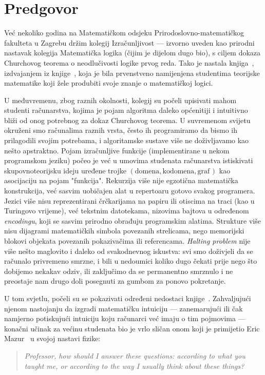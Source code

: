 \chapter[]{Predgovor}


Već nekoliko godina na Matematičkom odsjeku Prirodoslovno-matematičkog fakulteta u Zagrebu držim kolegij Izračunljivost --- izvorno uveden kao prirodni nastavak kolegija Matematička logika (čijim je dijelom dugo bio), s ciljem dokaza Churchovog teorema o neodlučivosti logike prvog reda. Tako je nastala knjiga~\cite{skr:Vuk}, izdvajanjem iz knjige~\cite{skr:VukML}, koja je bila prvenstveno namijenjena studentima teorijske matematike koji žele produbiti svoje znanje o matematičkoj logici.

U međuvremenu, zbog raznih okolnosti, kolegij su počeli upisivati mahom studenti računarstva, kojima je pojam algoritma daleko općenitiji i intuitivno bliži od onog potrebnog za dokaz Churchovog teorema. U suvremenom svijetu okruženi smo računalima raznih vrsta, često ih programiramo da bismo ih prilagodili svojim potrebama, i algoritamske sustave više ne doživljavamo kao nešto apstraktno. Pojam izračunljive funkcije (implementirane u nekom programskom jeziku) počeo je već u umovima studenata računarstva istiskivati skupovnoteorijsku ideju uređene trojke $(\text{domena},\text{kodomena},\text{graf}\mspace{2mu})$ kao asocijaciju na pojam "funkcija". Rekurzija više nije egzotična matematička konstrukcija, već sasvim uobičajen alat u repertoaru gotovo svakog programera. Jezici više nisu reprezentirani črčkarijama na papiru ili otiscima na traci (kao u Turingovo vrijeme), već tekstnim datotekama, nizovima bajtova u određenom \emph{encodingu}, koji se sasvim prirodno obrađuju programskim alatima. Strukture više nisu dijagrami matematičkih simbola povezanih strelicama, nego memorijski blokovi objekata povezanih pokazivačima ili referencama. \emph{Halting problem} nije više nešto maglovito i daleko od svakodnevnog iskustva: svi smo doživjeli da se računalo privremeno smrzne, i bili u nedoumici koliko dugo čekati prije nego što dobijemo nekakav odziv, ili zaključimo da se permanentno smrznulo i ne preostaje nam drugo doli posegnuti za gumbom za ponovo pokretanje. 

U tom svjetlu, počeli su se pokazivati određeni nedostaci knjige~\cite{skr:Vuk}. Zahvaljujući njenom nastojanju da izgradi matematičku intuiciju --- zanemarujući ili čak namjerno potiskujući intuiciju koju računarci već imaju o tim pojmovima --- konačni učinak za većinu studenata bio je vrlo sličan onom koji je primijetio Eric Mazur~\cite{mazur} u svojoj nastavi fizike:
\begin{quote}
    \emph{Professor, how should I answer these questions: according to what you \\ taught me, or according to the way I usually think about these things?}
\end{quote}

